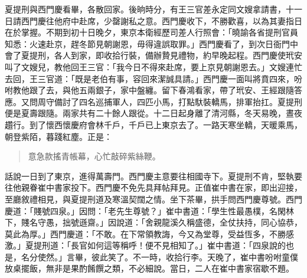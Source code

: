 夏提刑與西門慶看畢，各散回家。後晌時分，有王三官差永定同文嫂拿請書，十一日請西門慶往他府中赴席，少罄謝私之意。西門慶收下，不勝歡喜，以為其妻指日在於掌握。不期到初十日晚夕，東京本衛經歷司差人行照會：「曉諭各省提刑官員知悉：火速赴京，趕冬節見朝謝恩，毋得違誤取罪。」西門慶看了，到次日衙門中會了夏提刑，各人到家，即收拾行裝，備辦贄見禮物，約早晚起程。西門慶使玳安叫了文嫂兒，教他回王三官：「我今日不得來赴席，要上京見朝謝恩去。」文嫂連忙去回，王三官道：「既是老伯有事，容回來潔誠具請。」西門慶一面叫將賁四來，吩咐教他跟了去，與他五兩銀子，家中盤纏。留下春鴻看家，帶了玳安、王經跟隨答應。又問周守備討了四名巡捕軍人，四匹小馬，打點馱裝轎馬，排軍抬扛。夏提刑便是夏壽跟隨。兩家共有二十餘人跟從。十二日起身離了清河縣，冬天易晚，晝夜趲行。到了懷西懷慶府會林千戶，千戶已上東京去了。一路天寒坐轎，天暖乘馬，朝登紫陌，暮踐紅塵。正是：
\begin{quote}
意急款搖青帳幕，心忙敲碎紫絲鞭。
\end{quote}

話說一日到了東京，進得萬壽門。西門慶主意要往相國寺下。夏提刑不肯，堅執要往他親眷崔中書家投下。西門慶不免先具拜帖拜見。正值崔中書在家，即出迎接，至廳敘禮相見，與夏提刑道及寒溫契闊之情。坐下茶畢，拱手問西門慶尊號。西門慶道：「賤號四泉。」因問：「老先生尊號？」崔中書道：「學生性最愚樸，名閑林下，賤名守愚，拙號遜齋。」因說道：「舍親龍溪久稱盛德，全仗扶持，同心協恭，莫此為厚。」西門慶道：「不敢。在下常領教誨，今又為堂尊，受益恆多，不勝感激。」夏提刑道：「長官如何這等稱呼！便不見相知了。」崔中書道：「四泉說的也是，名分使然。」言畢，彼此笑了。不一時，收拾行李。天晚了，崔中書吩咐童僕放桌擺飯，無非是果酌餚饌之類，不必細說。當日，二人在崔中書家宿歇不題。

